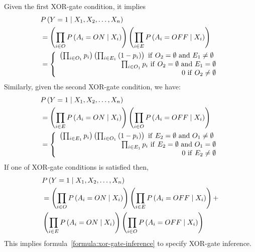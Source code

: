 \documentclass{article}
\numberwithin{equation}{section}
\numberwithin{figure}{section}
\numberwithin{table}{section}
\begin{document}
Given the first XOR-gate condition, it implies
\begin{align*}
&P\left(Y=1\mathrel{\left|\vphantom{Y=1 X_1,X_2,\dots ,X_n}\right.\kern-\nulldelimiterspace}X_1,X_2,\dots ,X_n\right)\\
&=\left(\prod_{i\in O}{P\left(A_i=ON\mathrel{\left|\vphantom{A_i=ON X_i}\right.\kern-\nulldelimiterspace}X_i\right)}\right)\left(\prod_{i\in E}{P\left(A_i=OFF\mathrel{\left|\vphantom{A_i=OFF X_i}\right.\kern-\nulldelimiterspace}X_i\right)}\right)\\
&=\left\{ \begin{array}{r}
\left(\prod_{i\in O_1}{p_i}\right)\left(\prod_{i\in E_1}{\left(1-p_i\right)}\right)\ \mathrm{if}\ O_2=\emptyset \ \mathrm{and}\ E_1\neq \emptyset \  \\ 
\prod_{i\in O_1}{p_i}\ \mathrm{if}\ O_2=\emptyset \ \mathrm{and}\ E_1=\emptyset  \\ 
0\ \mathrm{if}\ O_2\neq \emptyset  \end{array}
\right.
\end{align*}
Similarly, given the second XOR-gate condition, we have:
\begin{align*}
&P\left(Y=1\mathrel{\left|\vphantom{Y=1 X_1,X_2,\dots ,X_n}\right.\kern-\nulldelimiterspace}X_1,X_2,\dots ,X_n\right)\\
&=\left(\prod_{i\in E}{P\left(A_i=ON\mathrel{\left|\vphantom{A_i=ON X_i}\right.\kern-\nulldelimiterspace}X_i\right)}\right)\left(\prod_{i\in O}{P\left(A_i=OFF\mathrel{\left|\vphantom{A_i=OFF X_i}\right.\kern-\nulldelimiterspace}X_i\right)}\right)\\
&=\left\{ \begin{array}{r}
\left(\prod_{i\in E_1}{p_i}\right)\left(\prod_{i\in O_1}{\left(1-p_i\right)}\right)\ \mathrm{if}\ E_2=\emptyset \ \mathrm{and}\ O_1\neq \emptyset \  \\ 
\prod_{i\in E_1}{p_i}\ \mathrm{if}\ E_2=\emptyset \ \mathrm{and}\ O_1=\emptyset  \\ 
0\ \mathrm{if}\ E_2\neq \emptyset  \end{array}
\right.
\end{align*}
If one of XOR-gate conditions is satisfied then,
\begin{align*}
&P\left(Y=1\mathrel{\left|\vphantom{Y=1 X_1,X_2,\dots ,X_n}\right.\kern-\nulldelimiterspace}X_1,X_2,\dots ,X_n\right)\\
&=\left(\prod_{i\in O}{P\left(A_i=ON\mathrel{\left|\vphantom{A_i=ON X_i}\right.\kern-\nulldelimiterspace}X_i\right)}\right)\left(\prod_{i\in E}{P\left(A_i=OFF\mathrel{\left|\vphantom{A_i=OFF X_i}\right.\kern-\nulldelimiterspace}X_i\right)}\right)+\\
&\left(\prod_{i\in E}{P\left(A_i=ON\mathrel{\left|\vphantom{A_i=ON X_i}\right.\kern-\nulldelimiterspace}X_i\right)}\right)\left(\prod_{i\in O}{P\left(A_i=OFF\mathrel{\left|\vphantom{A_i=OFF X_i}\right.\kern-\nulldelimiterspace}X_i\right)}\right)
\end{align*}
This implies formula~\ref{formula:xor-gate-inference} to specify XOR-gate inference.
\end{document}
